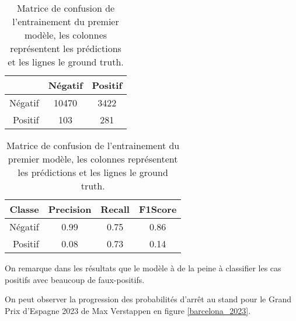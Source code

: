 \begin{table}[H]
    \begin{center}
        \caption{\label{rf_matrix}Matrice de confusion de l'entrainement du premier modèle, les colonnes représentent les prédictions et les lignes le ground truth.}
        \begin{tabular}{r|cc}
                    & Négatif & Positif \\ \hline
            Négatif & 10470   & 3422    \\
            Positif & 103     & 281     \\
        \end{tabular}
    \end{center}
\end{table}

\begin{table}[H]
    \begin{center}
        \caption{\label{rf_results}Matrice de confusion de l'entrainement du premier modèle, les colonnes représentent les prédictions et les lignes le ground truth.}
        \begin{tabular}{r|ccc}
            Classe  & Precision & Recall & F1Score \\ \hline
            Négatif & 0.99      & 0.75   & 0.86    \\
            Positif & 0.08      & 0.73   & 0.14    \\
        \end{tabular}
    \end{center}
\end{table}

On remarque dans les résultats que le modèle à de la peine à classifier les cas positifs avec beaucoup de faux-positifs.

On peut observer la progression des probabilités d'arrêt au stand pour le Grand Prix d'Espagne 2023 de Max Verstappen en figure \ref{barcelona_2023}.


